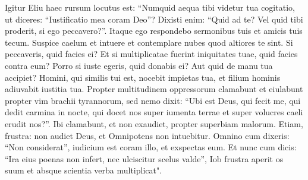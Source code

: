 \begin{biblechapter}  
\verse Igitur Eliu haec rursum locutus est: 
\verse “Numquid aequa tibi videtur tua cogitatio, ut diceres: “Iustificatio mea coram Deo”? 
\verse Dixisti enim: “Quid ad te? Vel quid tibi proderit, si ego peccavero?”. 
\verse Itaque ego respondebo sermonibus tuis et amicis tuis tecum. 
\verse Suspice caelum et intuere et contemplare nubes quod altiores te sint. 
\verse Si peccaveris, quid facies ei? Et si multiplicatae fuerint iniquitates tuae, quid facies contra eum? 
\verse Porro si iuste egeris, quid donabis ei? Aut quid de manu tua accipiet? 
\verse Homini, qui similis tui est, nocebit impietas tua, et filium hominis adiuvabit iustitia tua. 
\verse Propter multitudinem oppressorum clamabunt et eiulabunt propter vim brachii tyrannorum, 
\verse sed nemo dixit: “Ubi est Deus, qui fecit me, qui dedit carmina in nocte, 
\verse qui docet nos super iumenta terrae et super volucres caeli erudit nos?”. 
\verse Ibi clamabunt, et non exaudiet, propter superbiam malorum. 
\verse Etiam, frustra: non audiet Deus, et Omnipotens non intuebitur. 
\verse Omnino cum dixeris: “Non considerat”, iudicium est coram illo, et exspectas eum. 
\verse Et nunc cum dicis: “Ira eius poenas non infert, nec ulciscitur scelus valde”, 
\verse Iob frustra aperit os suum et absque scientia verba multiplicat". 
\end{biblechapter}

